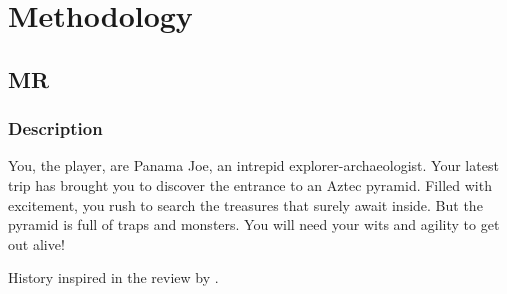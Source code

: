 \chapter{Methodology}
\section{\acl{MR}}
\subsection{Description}
You, the player, are Panama Joe, an intrepid explorer-archaeologist. Your latest
trip has brought you to discover the entrance to an Aztec pyramid. Filled with
excitement, you rush to search the treasures that surely await inside. But the
pyramid is full of traps and monsters. You will need your wits and agility to
get out alive!

History inspired in the review by \citet{adair2007montezuma}.

